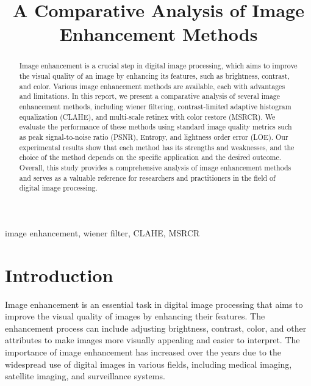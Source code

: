 \documentclass[conference]{IEEEtran}
\begin{document}
\title{A Comparative Analysis of Image Enhancement Methods
}

\author{
}

\maketitle
\begin{abstract}
Image enhancement is a crucial step in digital image processing, which aims to improve the visual quality of an image by enhancing its features, such as brightness, contrast, and color. Various image enhancement methods are available, each with advantages and limitations. In this report, we present a comparative analysis of several image enhancement methods, including wiener filtering, contrast-limited adaptive histogram equalization (CLAHE), and multi-scale retinex with color restore (MSRCR). We evaluate the performance of these methods using standard image quality metrics such as peak signal-to-noise ratio (PSNR), Entropy, and lightness order error (LOE). Our experimental results show that each method has its strengths and weaknesses, and the choice of the method depends on the specific application and the desired outcome. Overall, this study provides a comprehensive analysis of image enhancement methods and serves as a valuable reference for researchers and practitioners in the field of digital image processing.
\end{abstract}

\begin{IEEEkeywords}
image enhancement, wiener filter, CLAHE, MSRCR
\end{IEEEkeywords}

\section{Introduction}
Image enhancement is an essential task in digital image processing that aims to improve the visual quality of images by enhancing their features. The enhancement process can include adjusting brightness, contrast, color, and other attributes to make images more visually appealing and easier to interpret. The importance of image enhancement has increased over the years due to the widespread use of digital images in various fields, including medical imaging, satellite imaging, and surveillance systems.
\end{document}
